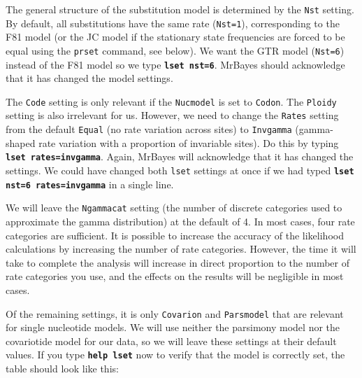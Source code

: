 \documentclass[12pt]{book}
\newcommand{\ttt}[1]{\texttt{#1}}
\newcommand{\tb}[1]{\ttt{\textbf{#1}}}
\begin{document}
The general structure of the substitution model is determined by the \ttt{Nst} setting. By default,
all substitutions have the same rate (\ttt{Nst=1}), corresponding to the F81 model (or the JC model
if the stationary state frequencies are forced to be equal using the \ttt{prset} command, see
below). We want the GTR model (\ttt{Nst=6}) instead of the F81 model so we type \tb{lset nst=6}.
MrBayes should acknowledge that it has changed the model settings.

The \ttt{Code} setting is only relevant if the \ttt{Nucmodel} is set to \ttt{Codon}. The
\ttt{Ploidy} setting is also irrelevant for us. However, we need to change the \ttt{Rates} setting
from the default \ttt{Equal} (no rate variation across sites) to \ttt{Invgamma} (gamma-shaped rate
variation with a proportion of invariable sites). Do this by typing \tb{lset rates=invgamma}.
Again, MrBayes will acknowledge that it has changed the settings. We could have changed both
\ttt{lset} settings at once if we had typed \tb{lset nst=6 rates=invgamma} in a single line.

We will leave the \ttt{Ngammacat} setting (the number of discrete categories used to approximate
the gamma distribution) at the default of 4. In most cases, four rate categories are sufficient. It
is possible to increase the accuracy of the likelihood calculations by increasing the number of
rate categories. However, the time it will take to complete the analysis will increase in direct
proportion to the number of rate categories you use, and the effects on the results will be
negligible in most cases.

Of the remaining settings, it is only \ttt{Covarion} and \ttt{Parsmodel} that are relevant for
single nucleotide models. We will use neither the parsimony model nor the covariotide model for our
data, so we will leave these settings at their default values. If you type \tb{help lset} now to
verify that the model is correctly set, the table should look like this:
\end{document}
